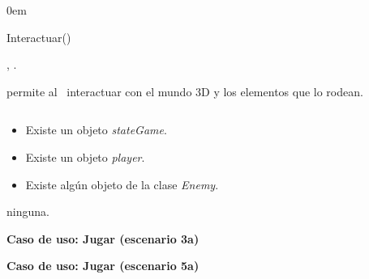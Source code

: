 \begin{description}
    \itemsep0em
    \item [Operación] Interactuar()
    \item [Actores] \jugador, \sistema.
    \item [Responsabilidades] permite al \jugador\ interactuar con el mundo
    3D y los elementos que lo rodean.
    \item [Precondiciones]$\quad$
        \begin{itemize}
            \itemsep0em
            \item Existe un objeto \textit{stateGame}.
            \item Existe un objeto \textit{player}.
            \item Existe algún objeto de la clase \textit{Enemy}.
        \end{itemize}
    \item [Postcondiciones] ninguna.\\
\end{description}


\textbf{Caso de uso: Jugar (escenario 3a)}



\textbf{Caso de uso: Jugar (escenario 5a)}



